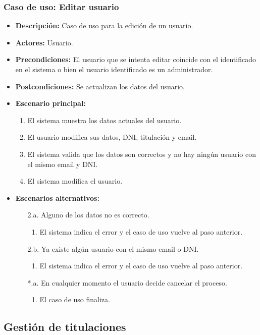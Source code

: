 \subsubsection*{Caso de uso: Editar usuario}
\label{editar_usuario}
\begin{itemize}
\item{\bf Descripción:} Caso de uso para la edición de un usuario.
\item{\bf Actores:} Usuario.
\item{\bf Precondiciones:} El usuario que se intenta editar coincide con el identificado en el sistema o bien el usuario identificado es un administrador.
\item{\bf Postcondiciones:} Se actualizan los datos del usuario.
\item{\bf Escenario principal:}
\begin{enumerate}
\item El sistema muestra los datos actuales del usuario.
\item El usuario modifica sus datos, DNI, titulación y email.
\item El sistema valida que los datos son correctos y no hay ningún usuario con el mismo email y DNI.
\item El sistema modifica el usuario.
\end{enumerate}
\item{\bf Escenarios alternativos:}
\begin{itemize}
\item[2.a.] Alguno de los datos no es correcto.
\begin{enumerate}
\item El sistema indica el error y el caso de uso vuelve al paso anterior.
\end{enumerate}
\item[2.b.] Ya existe algún usuario con el mismo email o DNI.
\begin{enumerate}
\item El sistema indica el error y el caso de uso vuelve al paso anterior.
\end{enumerate}
\item[*.a.] En cualquier momento el usuario decide cancelar el proceso.
\begin{enumerate}
\item El caso de uso finaliza.
\end{enumerate}
\end{itemize}
\end{itemize}


\subsection{Gestión de titulaciones}

